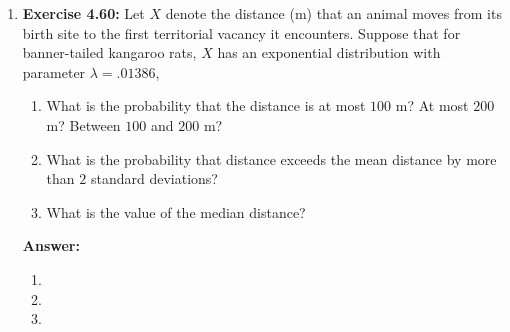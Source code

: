 \documentclass[12pt]{article}
\theoremstyle{homework}
\begin{document}
\begin{enumerate}
\item\hspace{.5in}\textbf{Exercise 4.60:} Let $X$ denote the distance (m) that an animal moves from its birth site to the first territorial vacancy it encounters. Suppose that for banner-tailed kangaroo rats, $X$ has an exponential distribution with parameter $\lambda = .01386$,
\begin{enumerate}
\item What is the probability that the distance is at most $100$ m? At most $200$ m? Between $100$ and $200$ m?
\item What is the probability that distance exceeds the mean distance by more than $2$ standard deviations?
\item What is the value of the median distance?
\end{enumerate}
\textbf{Answer:} 
\begin{enumerate}
\item
\item
\item
\end{enumerate}
\vspace{.5in}




\end{enumerate}
\end{document}
